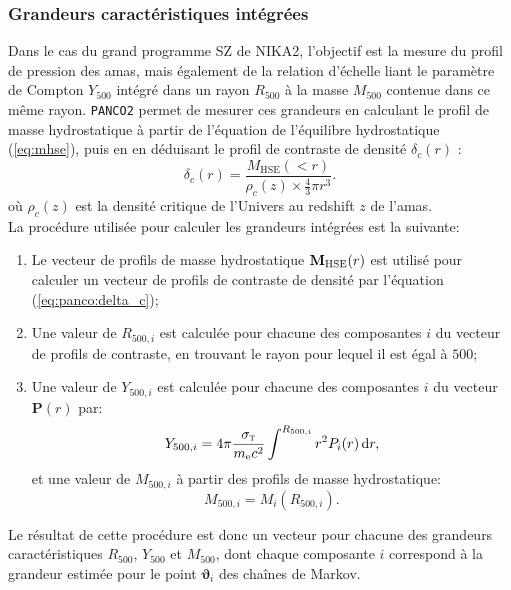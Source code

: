 \subsubsection{Grandeurs caractéristiques intégrées} %
\label{sec:panco:integrated_qties}
Dans le cas du grand programme SZ de NIKA2, l'objectif est la mesure du profil de pression des amas, mais également de la relation d'échelle liant le paramètre de Compton $Y_{500}$ intégré dans un rayon $R_{500}$ à la masse $M_{500}$ contenue dans ce même rayon.
\texttt{PANCO2} permet de mesurer ces grandeurs en calculant le profil de masse hydrostatique à partir de l'équation de l'équilibre hydrostatique (\ref{eq:mhse}), puis en en déduisant le profil de contraste de densité $\delta_c(r)$ :
\begin{equation}
    \label{eq:panco:delta_c}
    \delta_c(r) = \frac{M_\mathrm{HSE}(<r)}{\rho_c(z) \times \frac{4}{3} \pi r^3}.
\end{equation}
où $\rho_c(z)$ est la densité critique de l'Univers au redshift $z$ de l'amas. \\
La procédure utilisée pour calculer les grandeurs intégrées est la suivante:
\begin{enumerate}[leftmargin=*]
    \item Le vecteur de profils de masse hydrostatique $\mathbf{M}_{\rm HSE}(r)$ est utilisé pour calculer un vecteur de profils de contraste de densité par l'équation (\ref{eq:panco:delta_c});
    \item Une valeur de $R_{500,i}$ est calculée pour chacune des composantes $i$ du vecteur de profils de contraste, en trouvant le rayon pour lequel il est égal à $500$;
    \item Une valeur de $Y_{500, i}$ est calculée pour chacune des composantes $i$ du vecteur $\mathbf{P}(r)$ par:
    \begin{equation}
        Y_{500, i} = 4\pi \frac{\sigma_\textsc{t}}{m_{\rm e} c^2}\int^{R_{500, i}} r^2 P_i(r) \, \mathrm{d} r,
    \end{equation}
    et une valeur de $M_{500, i}$ à partir des profils de masse hydrostatique:
    \begin{equation}
        M_{500, i} = M_i(R_{500, i}).
    \end{equation}
\end{enumerate}
Le résultat de cette procédure est donc un vecteur pour chacune des grandeurs caractéristiques $R_{500}$, $Y_{500}$ et $M_{500}$, dont chaque composante $i$ correspond à la grandeur estimée pour le point $\mathbf{\vartheta}_i$ des chaînes de Markov.
